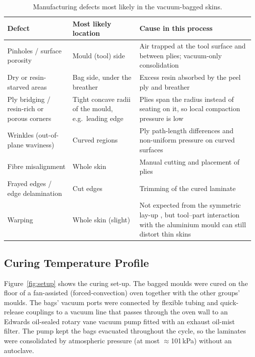 \documentclass[11pt,a4paper]{article}
\newenvironment{addedblock}{\color{addgreen}}{}
\newcommand{\addedfloat}{\color{addgreen}}
\newenvironment{addedblock}{}{}
\newcommand{\addedfloat}{}
\begin{document}
\begin{table}[htbp]
    \addedfloat
    \centering
    \caption{Manufacturing defects most likely in the vacuum-bagged
    skins.}
    \label{tab:defects}
    \footnotesize
    \renewcommand{\arraystretch}{1.12}
    \begin{tabularx}{\linewidth}{@{}>{\raggedright\arraybackslash}p{3.7cm}>{\raggedright\arraybackslash}p{4.2cm}L@{}}
        \toprule
        \textbf{Defect} & \textbf{Most likely location} & \textbf{Cause in this process} \\
        \midrule
        Pinholes / surface porosity & Mould (tool) side & Air trapped at the tool surface and between plies; vacuum-only consolidation \citep{hamill2015,centea2015,mehdikhani2019} \\
        Dry or resin-starved areas & Bag side, under the breather & Excess resin absorbed by the peel ply and breather \citep{sengodan2013,hexcel2013} \\
        Ply bridging / resin-rich or porous corners & Tight concave radii of the mould, e.g.\ leading edge & Plies span the radius instead of seating on it, so local compaction pressure is low \citep{levy2014} \\
        Wrinkles (out-of-plane waviness) & Curved regions & Ply path-length differences and non-uniform pressure on curved surfaces \citep{thor2020,elkington2015} \\
        Fibre misalignment & Whole skin & Manual cutting and placement of plies \citep{elkington2015,potter2008} \\
        Frayed edges / edge delamination & Cut edges & Trimming of the cured laminate \citep{teti2002} \\
        Warping & Whole skin (slight) & Not expected from the symmetric lay-up \citep{mallick2007}, but tool--part interaction with the aluminium mould can still distort thin skins \citep{twigg2004,kappel2016} \\
        \bottomrule
    \end{tabularx}
\end{table}

\begin{addedblock}
\subsection{Curing Temperature Profile}

Figure~\ref{fig:setup} shows the curing set-up. The bagged moulds were
cured on the floor of a fan-assisted (forced-convection) oven together
with the other groups' moulds. The bags' vacuum ports were connected
by flexible tubing and quick-release couplings to a vacuum line that
passes through the oven wall to an Edwards oil-sealed rotary vane
vacuum pump fitted with an exhaust oil-mist filter. The pump kept the
bags evacuated throughout the cycle, so the laminates were
consolidated by atmospheric pressure (at most $\approx$101\,kPa)
without an autoclave.
\end{addedblock}
\end{document}
